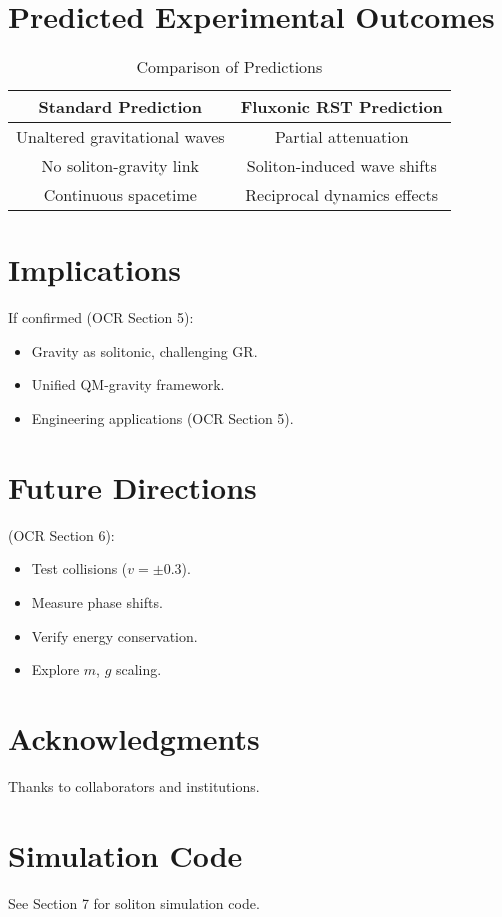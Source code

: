 \documentclass{article}
\begin{document}
\section{Predicted Experimental Outcomes}
\begin{table}[h]
    \centering
    \begin{tabular}{|c|c|}
        \hline
        \textbf{Standard Prediction} & \textbf{Fluxonic RST Prediction} \\
        \hline
        Unaltered gravitational waves & Partial attenuation \\
        No soliton-gravity link & Soliton-induced wave shifts \\
        Continuous spacetime & Reciprocal dynamics effects \\
        \hline
    \end{tabular}
    \caption{Comparison of Predictions}
    \label{tab:predictions}
\end{table}

\section{Implications}
If confirmed (OCR Section 5):
\begin{itemize}
    \item Gravity as solitonic, challenging GR.
    \item Unified QM-gravity framework.
    \item Engineering applications (OCR Section 5).
\end{itemize}

\section{Future Directions}
(OCR Section 6):
\begin{itemize}
    \item Test collisions (\(v = \pm 0.3\)).
    \item Measure phase shifts.
    \item Verify energy conservation.
    \item Explore \(m\), \(g\) scaling.
\end{itemize}

\section*{Acknowledgments}
Thanks to collaborators and institutions.

\appendix
\section{Simulation Code}
See Section 7 for soliton simulation code.
\end{document}
